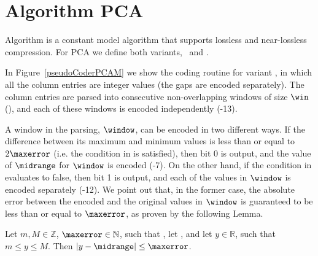 
\newcommand{\WindowParam}{}

\newcommand{\BothVariantsOne}[1]{For {#1} we define both variants, \maskalgo\ and \NOmaskalgo}
\newcommand{\BothVariantsTwo}[1]{{#1} supports both variants, \maskalgo\ and \NOmaskalgo}
\newcommand{\SingleVariant}[1]{For {#1} we define a single variant, \maskalgo}


\clearpage
\section{Algorithm PCA}
\label{algo:pca}


\vspace{-5pt}
Algorithm \textit{\PCAfull} \cite{coder:pca} is a constant model algorithm that supports lossless and near-lossless compression. \WindowParam \BothVariantsOne{PCA}.


In Figure~\ref{pseudoCoderPCAM} we show the coding routine for variant \maskalgo, in which all the column entries are integer values (the gaps are encoded separately). The column entries are parsed into consecutive non-overlapping windows of size $\win$ (), and each of these windows is encoded independently (-13). 





A window in the parsing, $\window$, can be encoded in two different ways. If the difference between its maximum and minimum values is less than or equal to $2\maxerror$ (i.e. the condition in  is satisfied), then bit 0 is output, and the value of $\midrange$ for $\window$ is encoded (-7). On the other hand, if the condition in  evaluates to false, then bit 1 is output, and each of the values in $\window$ is encoded separately (-12). We point out that, in the former case, the absolute error between the encoded and the original values in $\window$ is guaranteed to be less than or equal to $\maxerror$, as proven by the following Lemma.


\begin{lemma}
\label{lemma:pca}
\textnormal{
Let $m, M\in \mathbb{Z}$, $\maxerror \in \mathbb{N}$, such that \validThreTwo, let \calculateMidrange, and let $y\in \mathbb{R}$, such that $m\leq y\leq M$. Then $|y-\midrange|\leq \maxerror$.
}
\end{lemma}

